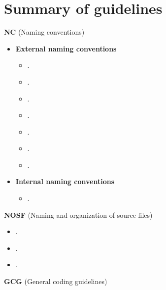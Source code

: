 %
\section{Summary of guidelines}
\label{sec:summary_guidelines}
%

\noindent\textbf{NC} (Naming conventions)

  \setcounter{Thyra_NC_counter}{0}

  \begin{itemize}
  {}\item\textbf{External naming conventions}
    \begin{itemize}
    {}\item\NCClassNames.
    {}\item\NCNamespaceNames.
    {}\item\NCEnumNames.
    {}\item\NCObjectNames.
    {}\item\NCFunctionNames.
    {}\item\NCBaseDefaultClassNames.
    {}\item\NCConstNonconstAccessFunctionName.
    \end{itemize}
  {}\item\textbf{Internal naming conventions}
    \begin{itemize}
    {}\item\NCDataMemberNames.
    \end{itemize}
  \end{itemize}

\noindent\textbf{NOSF} (Naming and organization of source files)

  \setcounter{Thyra_NOSF_counter}{0}

  \begin{itemize}
  {}\item\NOSFFileExtension.
  {}\item\NOSFClassFiles.
  {}\item\NOSFIncludeGuards.
  \end{itemize}

\noindent\textbf{GCG} (General coding guidelines)

  \setcounter{Thyra_GCG_counter}{0}


